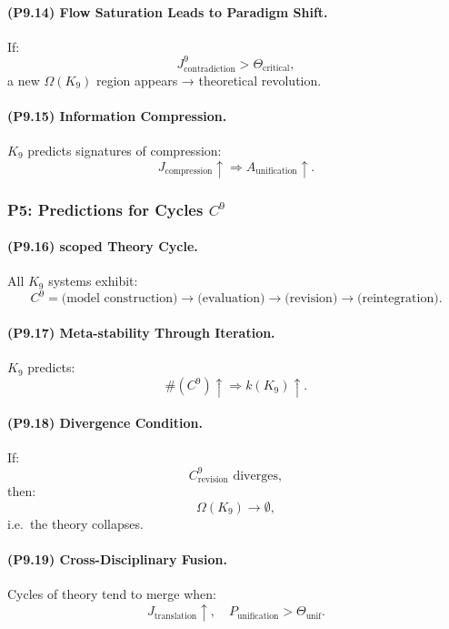 \paragraph{(P9.14) Flow Saturation Leads to Paradigm Shift.}
If:
\[
J_{\mathrm{contradiction}}^9 > \Theta_{\mathrm{critical}},
\]
a new $\Omega(K_9)$ region appears → theoretical revolution.

\paragraph{(P9.15) Information Compression.}
$K_9$ predicts signatures of compression:
\[
J_{\mathrm{compression}} \uparrow 
\Rightarrow 
A_{\mathrm{unification}} \uparrow.
\]

\subsubsection{P5: Predictions for Cycles \texorpdfstring{$C^9$}{C^9}}

\paragraph{(P9.16) scoped Theory Cycle.}
All $K_9$ systems exhibit:
\[
C^9 
= 
\text{(model construction)} 
\to 
\text{(evaluation)} 
\to 
\text{(revision)} 
\to 
\text{(reintegration)}.
\]

\paragraph{(P9.17) Meta-stability Through Iteration.}
$K_9$ predicts:
\[
\#(C^9) \uparrow 
\Rightarrow 
k(K_9) \uparrow.
\]

\paragraph{(P9.18) Divergence Condition.}
If:
\[
C_{\mathrm{revision}}^9 \text{ diverges},
\]
then:
\[
\Omega(K_9) \to \emptyset,
\]
i.e.\ the theory collapses.

\paragraph{(P9.19) Cross-Disciplinary Fusion.}
Cycles of theory tend to merge when:
\[
J_{\mathrm{translation}} \uparrow,
\quad 
P_{\mathrm{unification}} > \Theta_{\mathrm{unif}}.
\]

